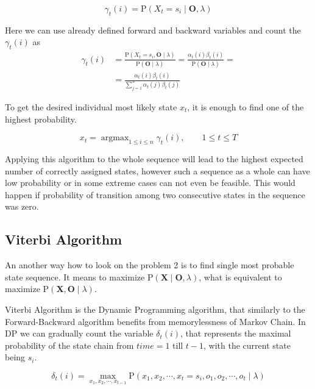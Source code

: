 \documentclass[thesis=M,english]{FITthesis}[2012/10/20]
\newcommand{\matr}[1]{\mathbf{#1}}
\newcommand{\argmax}{\mathop{\mathrm{argmax}}}
\begin{document}
\begin{equation}
\gamma_t(i) = \mathrm{P}(X_t = s_i \mid \matr{O},\lambda ) 
\end{equation}

Here we can use already defined forward and backward variables and count the $\gamma_t(i)$ as
\begin{equation}
\begin{aligned}
\gamma_t(i) &= \frac{ \mathrm{P}( X_t = s_i, \matr{O} \mid \lambda )}{ \mathrm{P}( \matr{O} \mid \lambda )} =
               \frac{  \alpha_t(i) \beta_t(i) }{ \mathrm{P}( \matr{O} \mid \lambda )} = \\
            &= \frac{  \alpha_t(i) \beta_t(i) }{ \sum\limits_{j=1}^n \alpha_t(j) \beta_t(j) } 
\end{aligned}
\end{equation}

To get the desired individual most likely state $x_t$, it is enough to find one of the highest probability.

\begin{equation}
x_t = \argmax_{1 \leq i \leq n} \gamma_t(i), \qquad 1 \leq t \leq T
\end{equation} 

Applying this algorithm to the whole sequence will lead to the highest expected number of correctly assigned states, however such a sequence as a whole can have low probability or in some extreme cases can not even be feasible. This would happen if probability of transition among two consecutive states in the sequence was zero.   
   
\subsection{Viterbi Algorithm} 

An another way how to look on the problem 2 is to find single most probable state sequence. It means to maximize $\mathrm{P}(\matr{X}\mid \matr{O},\lambda)$, what is equivalent to maximize $\mathrm{P}(\matr{X}, \matr{O}\mid\lambda)$. %

Viterbi Algorithm is the Dynamic Programming algorithm, that similarly to the Forward-Backward algorithm  benefits from memorylessness of Markov Chain. In DP we can gradually count the variable $\delta_t(i)$, that represents the maximal probability of the state chain from $time = 1$ till $t-1$, with the current state being $s_i$.

\begin{equation}\label{eq:delta}
\delta_t(i) = \max_{x_1,x_2,\cdots,x_{t-1}} \mathrm{P}( x_1,x_2,\cdots, x_t = s_i, o_1, o_2, \cdots, o_t \mid \lambda )
\end{equation} %
\end{document}
